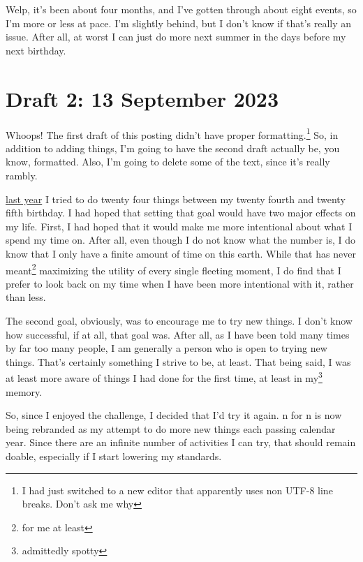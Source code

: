 \documentclass[12pt]{article}[titlepage]
\newcommand{\1}{\={a}}
\newcommand{\2}{\={e}}
\newcommand{\3}{\={\i}}
\newcommand{\4}{\=o}
\newcommand{\5}{\=u}
\newcommand{\6}{\={A}}
\renewcommand{\,}{\textsuperscript{,}}
\begin{document}
Welp, it's been about four months, and I've gotten through about eight events, so I'm more or less at pace.
I'm slightly behind, but I don't know if that's really an issue.
After all, at worst I can just do more next summer in the days before my next birthday.


\section{Draft 2: 13 September 2023}
Whoops!
The first draft of this posting didn't have proper formatting.\footnote{I had just switched to a new editor that apparently uses non UTF-8 line breaks.  
Don't ask me why}
So, in addition to adding things, I'm going to have the second draft actually be, you know, formatted. 
Also, I'm going to delete some of the text, since it's really rambly. 
 
\href{twenty-four.html}{last year} I tried to do twenty four things between my twenty fourth and twenty fifth birthday. I had hoped that setting that goal would have two major effects on my life. First, I had hoped that it would make me more intentional about what I spend my time on. After all, even though I do not know what the number is, I do know that I only have a finite amount of time on this earth. While that has never meant\footnote{for me at least} maximizing the utility of every single fleeting moment, I do find that I prefer to look back on my time when I have been more intentional with it, rather than less.
 
The second goal, obviously, was to encourage me to try new things. I don't know how successful, if at all, that goal was. After all, as I have been told many times by far too many people, I am generally a person who is open to trying new things. That's certainly something I strive to be, at least. That being said, I was at least more aware of things I had done for the first time, at least in my\footnote{admittedly spotty} memory.
 
So, since I enjoyed the challenge, I decided that I'd try it again. n for n is now being rebranded as my attempt to do more new things each passing calendar year. Since there are an infinite number of activities I can try, that should remain doable, especially if I start lowering my standards.
 
\end{document}
